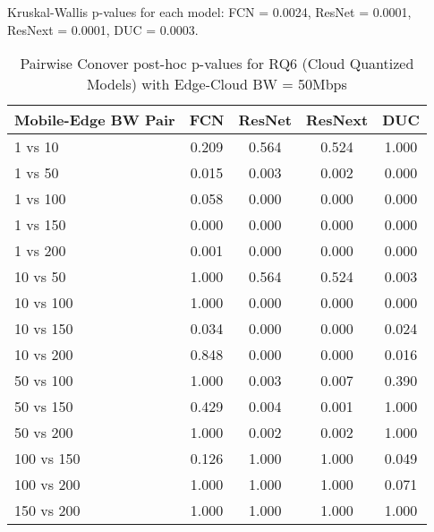 \begin{table}[h]
\centering
\caption{Pairwise Conover post-hoc p-values for RQ6 (Cloud Quantized Models) with Edge-Cloud BW = 50Mbps}
\label{tab:conover_cloud_quantized_ec50}
\smallskip
Kruskal-Wallis p-values for each model: FCN = 0.0024, ResNet = 0.0001, ResNext = 0.0001, DUC = 0.0003.

\begin{tabular}{lcccc}
\toprule
Mobile-Edge BW Pair & FCN & ResNet & ResNext & DUC \\
\midrule
1 vs 10 & 0.209 & 0.564 & 0.524 & 1.000 \\
1 vs 50 & 0.015 & 0.003 & 0.002 & 0.000 \\
1 vs 100 & 0.058 & 0.000 & 0.000 & 0.000 \\
1 vs 150 & 0.000 & 0.000 & 0.000 & 0.000 \\
1 vs 200 & 0.001 & 0.000 & 0.000 & 0.000 \\
10 vs 50 & 1.000 & 0.564 & 0.524 & 0.003 \\
10 vs 100 & 1.000 & 0.000 & 0.000 & 0.000 \\
10 vs 150 & 0.034 & 0.000 & 0.000 & 0.024 \\
10 vs 200 & 0.848 & 0.000 & 0.000 & 0.016 \\
50 vs 100 & 1.000 & 0.003 & 0.007 & 0.390 \\
50 vs 150 & 0.429 & 0.004 & 0.001 & 1.000 \\
50 vs 200 & 1.000 & 0.002 & 0.002 & 1.000 \\
100 vs 150 & 0.126 & 1.000 & 1.000 & 0.049 \\
100 vs 200 & 1.000 & 1.000 & 1.000 & 0.071 \\
150 vs 200 & 1.000 & 1.000 & 1.000 & 1.000 \\
\bottomrule
\end{tabular}
\end{table}

